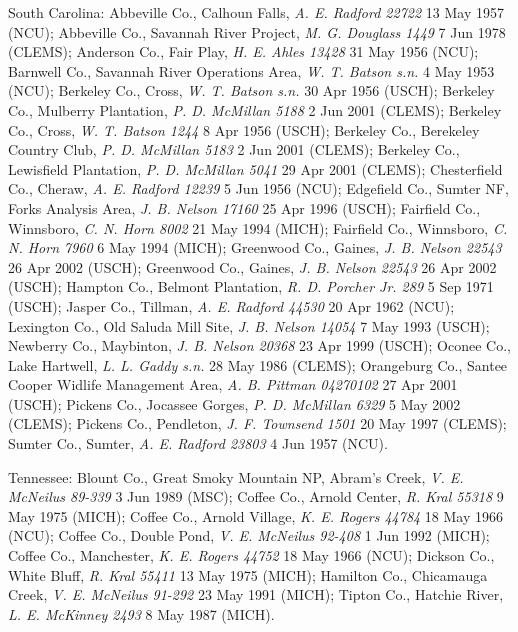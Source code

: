 \documentclass{article}
\begin{document}
South Carolina:
Abbeville Co., Calhoun Falls, \textit{A. E. Radford 22722} 13 May 1957 (NCU);
Abbeville Co., Savannah River Project, \textit{M. G. Douglass 1449} 7 Jun 1978 (CLEMS);
Anderson Co., Fair Play, \textit{H. E. Ahles 13428} 31 May 1956 (NCU);
Barnwell Co., Savannah River Operations Area, \textit{W. T. Batson s.n.} 4 May 1953 (NCU);
Berkeley Co., Cross, \textit{W. T. Batson s.n.} 30 Apr 1956 (USCH);
Berkeley Co., Mulberry Plantation, \textit{P. D. McMillan 5188} 2 Jun 2001 (CLEMS);
Berkeley Co., Cross, \textit{W. T. Batson 1244} 8 Apr 1956 (USCH);
Berkeley Co., Berekeley Country Club, \textit{P. D. McMillan 5183} 2 Jun 2001 (CLEMS);
Berkeley Co., Lewisfield Plantation, \textit{P. D. McMillan 5041} 29 Apr 2001 (CLEMS);
Chesterfield Co., Cheraw, \textit{A. E. Radford 12239} 5 Jun 1956 (NCU);
Edgefield Co., Sumter NF, Forks Analysis Area, \textit{J. B. Nelson 17160} 25 Apr 1996 (USCH);
Fairfield Co., Winnsboro, \textit{C. N. Horn 8002} 21 May 1994 (MICH);
Fairfield Co., Winnsboro, \textit{C. N. Horn 7960} 6 May 1994 (MICH);
Greenwood Co., Gaines, \textit{J. B. Nelson 22543} 26 Apr 2002 (USCH);
Greenwood Co., Gaines, \textit{J. B. Nelson 22543} 26 Apr 2002 (USCH);
Hampton Co., Belmont Plantation, \textit{R. D. Porcher Jr. 289} 5 Sep 1971 (USCH);
Jasper Co., Tillman, \textit{A. E. Radford 44530} 20 Apr 1962 (NCU);
Lexington Co., Old Saluda Mill Site, \textit{J. B. Nelson 14054} 7 May 1993 (USCH);
Newberry Co., Maybinton, \textit{J. B. Nelson 20368} 23 Apr 1999 (USCH);
Oconee Co., Lake Hartwell, \textit{L. L. Gaddy s.n.} 28 May 1986 (CLEMS);
Orangeburg Co., Santee Cooper Widlife Management Area, \textit{A. B. Pittman 04270102} 27 Apr 2001 (USCH);
Pickens Co., Jocassee Gorges, \textit{P. D. McMillan 6329} 5 May 2002 (CLEMS);
Pickens Co., Pendleton, \textit{J. F. Townsend 1501} 20 May 1997 (CLEMS);
Sumter Co., Sumter, \textit{A. E. Radford 23803} 4 Jun 1957 (NCU).

Tennessee:
Blount Co., Great Smoky Mountain NP, Abram's Creek, \textit{V. E. McNeilus 89-339} 3 Jun 1989 (MSC);
Coffee Co., Arnold Center, \textit{R. Kral 55318} 9 May 1975 (MICH);
Coffee Co., Arnold Village, \textit{K. E. Rogers 44784} 18 May 1966 (NCU);
Coffee Co., Double Pond, \textit{V. E. McNeilus 92-408} 1 Jun 1992 (MICH);
Coffee Co., Manchester, \textit{K. E. Rogers 44752} 18 May 1966 (NCU);
Dickson Co., White Bluff, \textit{R. Kral 55411} 13 May 1975 (MICH);
Hamilton Co., Chicamauga Creek, \textit{V. E. McNeilus 91-292} 23 May 1991 (MICH);
Tipton Co., Hatchie River, \textit{L. E. McKinney 2493} 8 May 1987 (MICH).
\end{document}
